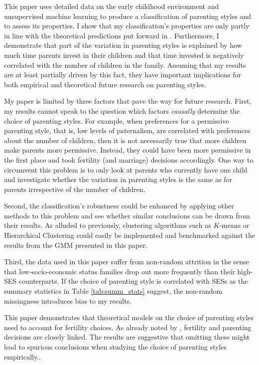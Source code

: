 This paper uses detailed data on the early childhood environment and unsupervised machine learning to produce a classification of parenting styles and to assess its properties. I show that my classification's properties are only partly in line with the theoretical predictions put forward in \textcites{doepkeParentingStyleAltruism2017}{doepkeEconomicsParenting2019}. Furthermore, I demonstrate that part of the variation in parenting styles is explained by how much time parents invest in their children and that time invested is negatively correlated with the number of children in the family. Assuming that my results are at least partially driven by this fact, they have important implications for both empirical and theoretical future research on parenting styles.

My paper is limited by three factors that pave the way for future research. First, my results cannot speak to the question which factors \textit{causally} determine the choice of parenting styles. For example, when preferences for a permissive parenting style, that is, low levels of paternalism, are correlated with preferences about the number of children, then it is not necessarily true that more children make parents more permissive. Instead, they could have been more permissive in the first place and took fertility (and marriage) decisions accordingly. One way to circumvent this problem is to only look at parents who currently have one child and investigate whether the variation in parenting styles is the same as for parents irrespective of the number of children.

Second, the classification's robustness could be enhanced by applying other methods to this problem and see whether similar conclusions can be drawn from their results. As alluded to previously, clustering algorithms such as $K$-means or Hierarchical Clustering could easily be implemented and benchmarked against the results from the GMM presented in this paper.    

Third, the data used in this paper suffer from non-random attrition in the sense that low-socio-economic status families drop out more frequently than their high-SES counterparts. If the choice of parenting style is correlated with SESs as the summary statistics in Table \ref{tab:summ_stats} suggest, the non-random missingness introduces bias to my results.

This paper demonstrates that theoretical models on the choice of parenting styles need to account for fertility choices. As already noted by \textcite{doepkeEconomicsParenting2019}, fertility and parenting decisions are closely linked. The results are suggestive that omitting these might lead to spurious conclusions when studying the choice of parenting styles empirically..